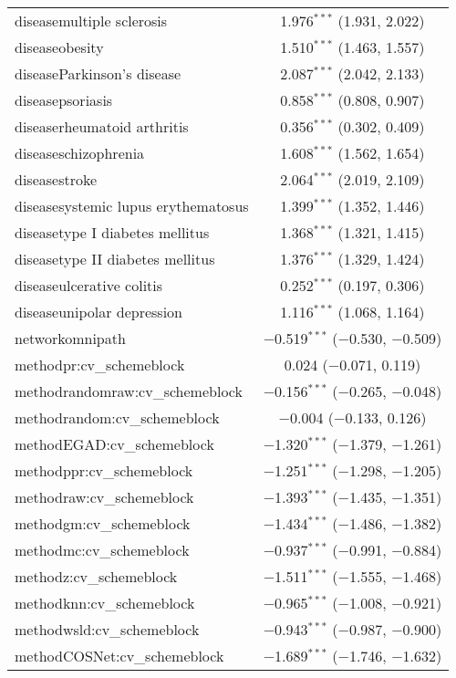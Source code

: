 \begin{table}[!htbp]
\begin{tabular}{@{\extracolsep{5pt}}lc}
  diseasemultiple sclerosis & 1.976$^{***}$ (1.931, 2.022) \\ 
  diseaseobesity & 1.510$^{***}$ (1.463, 1.557) \\ 
  diseaseParkinson's disease & 2.087$^{***}$ (2.042, 2.133) \\ 
  diseasepsoriasis & 0.858$^{***}$ (0.808, 0.907) \\ 
  diseaserheumatoid arthritis & 0.356$^{***}$ (0.302, 0.409) \\ 
  diseaseschizophrenia & 1.608$^{***}$ (1.562, 1.654) \\ 
  diseasestroke & 2.064$^{***}$ (2.019, 2.109) \\ 
  diseasesystemic lupus erythematosus & 1.399$^{***}$ (1.352, 1.446) \\ 
  diseasetype I diabetes mellitus & 1.368$^{***}$ (1.321, 1.415) \\ 
  diseasetype II diabetes mellitus & 1.376$^{***}$ (1.329, 1.424) \\ 
  diseaseulcerative colitis & 0.252$^{***}$ (0.197, 0.306) \\ 
  diseaseunipolar depression & 1.116$^{***}$ (1.068, 1.164) \\ 
  networkomnipath & $-$0.519$^{***}$ ($-$0.530, $-$0.509) \\ 
  methodpr:cv\_schemeblock & 0.024 ($-$0.071, 0.119) \\ 
  methodrandomraw:cv\_schemeblock & $-$0.156$^{***}$ ($-$0.265, $-$0.048) \\ 
  methodrandom:cv\_schemeblock & $-$0.004 ($-$0.133, 0.126) \\ 
  methodEGAD:cv\_schemeblock & $-$1.320$^{***}$ ($-$1.379, $-$1.261) \\ 
  methodppr:cv\_schemeblock & $-$1.251$^{***}$ ($-$1.298, $-$1.205) \\ 
  methodraw:cv\_schemeblock & $-$1.393$^{***}$ ($-$1.435, $-$1.351) \\ 
  methodgm:cv\_schemeblock & $-$1.434$^{***}$ ($-$1.486, $-$1.382) \\ 
  methodmc:cv\_schemeblock & $-$0.937$^{***}$ ($-$0.991, $-$0.884) \\ 
  methodz:cv\_schemeblock & $-$1.511$^{***}$ ($-$1.555, $-$1.468) \\ 
  methodknn:cv\_schemeblock & $-$0.965$^{***}$ ($-$1.008, $-$0.921) \\ 
  methodwsld:cv\_schemeblock & $-$0.943$^{***}$ ($-$0.987, $-$0.900) \\ 
  methodCOSNet:cv\_schemeblock & $-$1.689$^{***}$ ($-$1.746, $-$1.632) \\ 

\end{tabular}
\end{table}
